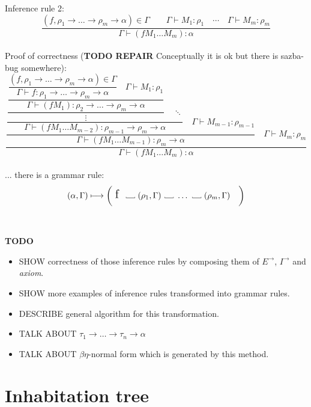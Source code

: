 \documentclass[12pt,a4paper]{report}
\newcommand\Vtextvisiblespace[1][.3em]{%
  \mbox{\kern.06em\vrule height.3ex}%
  \vbox{\hrule width#1}%
  \hbox{\vrule height.3ex}}
\begin{document}
Inference rule 2: 
\[
	\frac{ (f , \rho_1 \rightarrow \dots \rightarrow \rho_m \rightarrow \alpha ) \in \Gamma \qquad
	       \Gamma \vdash M_1 : \rho_1 \quad
	       \dotsm \quad
	       \Gamma \vdash M_m : \rho_m        
	      }
	     {\Gamma \vdash (f M_1 \dots M_m) : \alpha}
\]
\\
Proof of correctness (\textbf{TODO REPAIR} Conceptually it is ok but there is sazba-bug somewhere): 
\[
   \dfrac
     {\dfrac
      {\dfrac
       {\dfrac         
         {\dfrac  
          {\dfrac
           {\boxed{(f , \rho_1 \rightarrow \dots \rightarrow \rho_m \rightarrow \alpha ) \in \Gamma}}
           {\Gamma \vdash f : \rho_1 \rightarrow \dots \rightarrow \rho_m \rightarrow \alpha}
           \quad
           \boxed{\Gamma \vdash M_1 : \rho_1} }
          {\Gamma \vdash (f M_1) : \rho_2 \rightarrow \dots \rightarrow \rho_m \rightarrow \alpha }
          }{\vdots} 
         \quad 
         \ddots }
       {\Gamma \vdash (f M_1 \dots M_{m-2}) : \rho_{m-1} \rightarrow \rho_m \rightarrow \alpha}
       \quad
       \boxed{\Gamma \vdash M_{m-1} : \rho_{m-1}}  }
      {\Gamma \vdash (f M_1 \dots M_{m-1}) : \rho_m \rightarrow \alpha}       
      \quad 
      \boxed{\Gamma \vdash M_m : \rho_m} }
	 {\Gamma \vdash (f M_1 \dots M_m) : \alpha}
\]
\\
... there is a grammar rule:
\[ 
	( \alpha , \Gamma )  \longmapsto
	\bigg( \mbox{ {\Large f }}
	  \mbox{ \Vtextvisiblespace[1em] } 
	  ( \rho_1 , \Gamma )
	  \mbox{ \Vtextvisiblespace[1em] } 
	  \dots
	  \mbox{ \Vtextvisiblespace[1em] } 
	  ( \rho_m , \Gamma )
	  \quad \bigg)
\]
\\\\
\textbf{TODO} 
\begin{itemize}
	\item SHOW correctness of those inference rules by composing them of 
		  $E^{\rightarrow}$, $I^{\rightarrow}$ and \textit{axiom}.
	\item SHOW more examples of inference rules transformed into grammar rules.
	\item DESCRIBE general algorithm for this transformation.
	\item TALK ABOUT $\tau_1 \rightarrow \dots \rightarrow \tau_n \rightarrow \alpha$ 
	\item TALK ABOUT $\beta \eta$-normal form which is generated by this method.
\end{itemize}



\section{Inhabitation tree}
\end{document}
